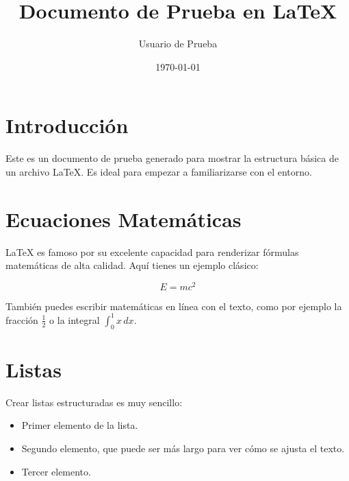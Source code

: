 \documentclass[12pt,a4paper]{article}
\title{Documento de Prueba en \LaTeX}
\author{Usuario de Prueba}
\date{\today}
\begin{document}
\maketitle

\section{Introducción}
Este es un documento de prueba generado para mostrar la estructura básica de un archivo \LaTeX. Es ideal para empezar a familiarizarse con el entorno.

\section{Ecuaciones Matemáticas}
\LaTeX{} es famoso por su excelente capacidad para renderizar fórmulas matemáticas de alta calidad. Aquí tienes un ejemplo clásico:

\begin{equation}
    E = mc^2
\end{equation}

También puedes escribir matemáticas en línea con el texto, como por ejemplo la fracción $\frac{1}{2}$ o la integral $\int_{0}^{1} x \, dx$.

\section{Listas}
Crear listas estructuradas es muy sencillo:

\begin{itemize}
    \item Primer elemento de la lista.
    \item Segundo elemento, que puede ser más largo para ver cómo se ajusta el texto.
    \item Tercer elemento.
\end{itemize}
\end{document}
